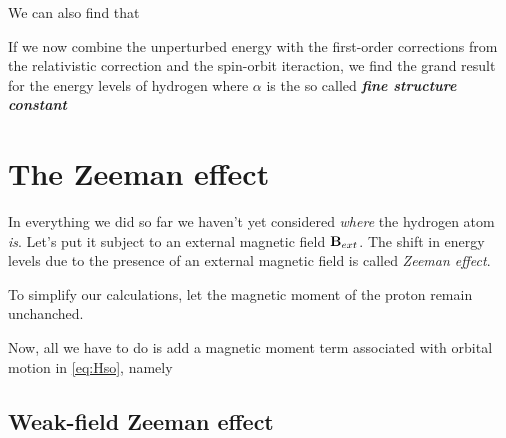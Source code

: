 \documentclass[oneside, 12pt, notitlepage]{book}
\begin{document}
We can also find that
\par

If we now combine the unperturbed energy with the first-order corrections from the relativistic correction and the spin-orbit iteraction, we find the grand result for the energy levels of hydrogen
where \(\alpha\) is the so called \emph{\textbf{fine structure constant}}
\par



\section{The Zeeman effect}

In everything we did so far we haven't yet considered \emph{where} the hydrogen atom \emph{is}. Let's put it subject to an external magnetic field \(\vb{B}_{ext}\). The shift in energy levels due to the presence of an external magnetic field is called \emph{Zeeman effect}.\par

To simplify our calculations, let the magnetic moment of the proton remain unchanched.\par

Now, all we have to do is add a magnetic moment term
associated with orbital motion in \eqref{eq:Hso}, namely

\subsection{Weak-field Zeeman effect}
\end{document}
